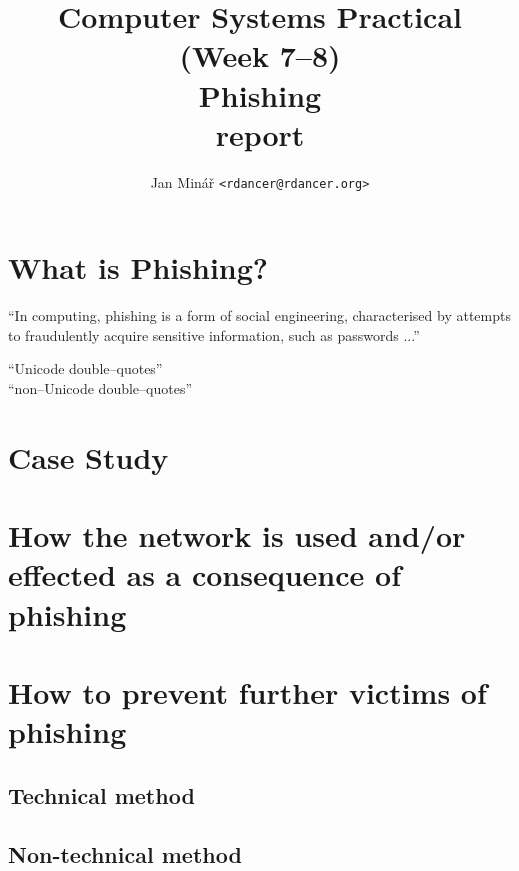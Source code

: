 \documentclass[10pt]{article}
\author{Jan Minář {\tt <rdancer@rdancer.org>}}
\title{Computer Systems Practical (Week 7--8)\\Phishing\\report}
\begin{document}
\maketitle

%

%
%

\section{What is Phishing?}
``In computing, phishing is a form of social engineering, characterised by attempts to fraudulently acquire sensitive information, such as passwords ...'' \cite{gwavanation:phishing-definition}

“Unicode double–quotes”\\
“non–Unicode double–quotes”

%
%
\section{Case Study}

%
%

\section{How the network is used and/or effected as a consequence of phishing}

%
%

\section{How to prevent further victims of phishing}

%
%

\subsection{Technical method}

%
%

\subsection{Non-technical method}

%
%



\end{document}
